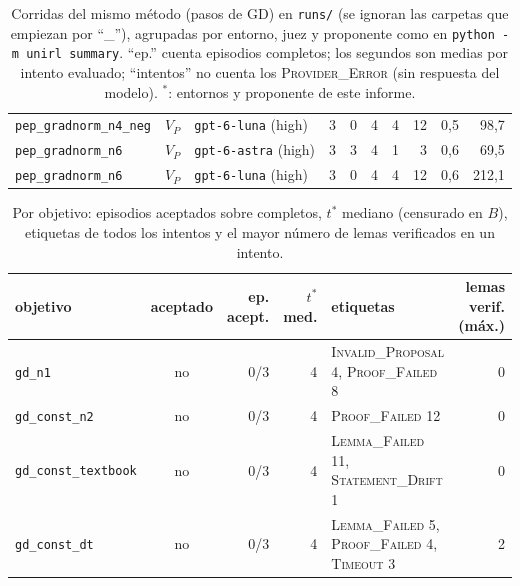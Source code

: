 \documentclass[11pt,a4paper]{article}
\begin{document}
\begin{table}[!ht]
\begin{tabular}{@{}llllrrrrrr@{}}
\texttt{pep\_\allowbreak{}gradnorm\_\allowbreak{}n4\_\allowbreak{}neg} & $V_P$ & \texttt{gpt-\allowbreak{}6-\allowbreak{}luna} (high) & 3 & 0 & 4 & 4 & 12 & 0{,}5 & 98{,}7 \\
\texttt{pep\_\allowbreak{}gradnorm\_\allowbreak{}n6} & $V_P$ & \texttt{gpt-\allowbreak{}6-\allowbreak{}astra} (high) & 3 & 3 & 4 & 1 & 3 & 0{,}6 & 69{,}5 \\
\texttt{pep\_\allowbreak{}gradnorm\_\allowbreak{}n6} & $V_P$ & \texttt{gpt-\allowbreak{}6-\allowbreak{}luna} (high) & 3 & 0 & 4 & 4 & 12 & 0{,}6 & 212{,}1 \\
\bottomrule
\end{tabular}
\caption{Corridas del mismo método (pasos de GD) en \texttt{runs/} (se ignoran las carpetas que empiezan por ``\_''), agrupadas por entorno, juez y proponente como en \texttt{python -m unirl summary}. ``ep.'' cuenta episodios completos; los segundos son medias por intento evaluado; ``intentos'' no cuenta los \textsc{Provider\_Error} (sin respuesta del modelo). $^\ast$: entornos y proponente de este informe.}
\label{tab:comparacion}
\end{table}

\begin{table}[!ht]
\centering
\footnotesize
\setlength{\tabcolsep}{4pt}
\begin{tabular}{@{}lcrrp{4.6cm}r@{}}
\toprule
objetivo & aceptado & ep. acept. & $t^*$ med. & etiquetas & lemas verif. (máx.) \\
\midrule
\texttt{gd\_\allowbreak{}n1} & no & 0/3 & 4 & \textsc{Invalid\_Proposal} 4, \textsc{Proof\_Failed} 8 & 0 \\
\texttt{gd\_\allowbreak{}const\_\allowbreak{}n2} & no & 0/3 & 4 & \textsc{Proof\_Failed} 12 & 0 \\
\texttt{gd\_\allowbreak{}const\_\allowbreak{}textbook} & no & 0/3 & 4 & \textsc{Lemma\_Failed} 11, \textsc{Statement\_Drift} 1 & 0 \\
\texttt{gd\_\allowbreak{}const\_\allowbreak{}dt} & no & 0/3 & 4 & \textsc{Lemma\_Failed} 5, \textsc{Proof\_Failed} 4, \textsc{Timeout} 3 & 2 \\
\bottomrule
\end{tabular}
\caption{Por objetivo: episodios aceptados sobre completos, $t^*$ mediano (censurado en $B$), etiquetas de todos los intentos y el mayor número de lemas verificados en un intento.}
\label{tab:objetivos}
\end{table}
\end{document}
